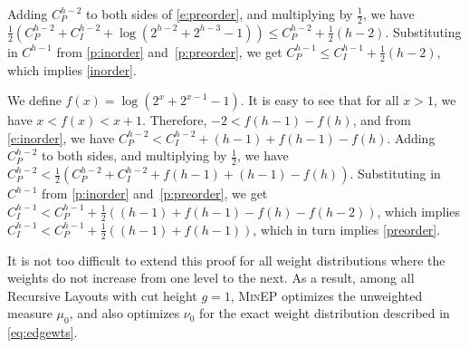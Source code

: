 \documentclass[10pt,conference,letterpaper]{IEEEtran}
\newcommand{\todo}[1]{}
\newcommand{\RLs}{Recursive Layouts\xspace}
\newcommand{\pmean}[1][p]{\ensuremath{\mu_{#1}}\xspace}
\newcommand{\pwmean}[1][p]{\ensuremath{\nu_{#1}}\xspace}
\newcommand{\minep}{\textsc{MinEP}\xspace}
\begin{document}
\begin{IEEEproof}
Adding $C_P^{h-2}$ to both sides of \eqref{e:preorder}, and multiplying by $\frac{1}{2}$, we have
$\frac{1}{2} (C_P^{h-2} + C_I^{h-2} + \log(2^{h-2}+2^{h-3}-1)) \leq C_P^{h-2} + \frac{1}{2} (h-2)$. 
Substituting in $C^{h-1}$ from \eqref{p:inorder} and~\eqref{p:preorder}, we get
$C_P^{h-1} \leq C_I^{h-1} + \frac{1}{2} (h-2)$, which implies \eqref{inorder}.

We define $f(x) = \log (2^x + 2^{x-1} - 1)$. It is easy to see that for all $x>1$, we have $x < f(x) < x+1$. Therefore, $-2 < f(h-1) - f(h)$, and from \eqref{e:inorder}, we have $C_P^{h-2} < C_I^{h-2} + (h-1) + f(h-1) - f(h)$.
Adding $C_P^{h-2}$ to both sides, and multiplying by $\frac{1}{2}$, we have 
$C_P^{h-2} < \frac{1}{2} (C_P^{h-2} + C_I^{h-2} + f(h-1) + (h-1) - f(h))$. 
Substituting in $C^{h-1}$ from \eqref{p:inorder} and~\eqref{p:preorder}, we get 
$C_I^{h-1} < C_P^{h-1} + \frac{1}{2} ((h-1) + f(h-1) - f(h) - f(h-2))$, which implies 
$C_I^{h-1} < C_P^{h-1} + \frac{1}{2} ((h-1) + f(h-1))$, which in turn implies 
\eqref{preorder}.

It is not too difficult to extend this proof for all weight distributions where the weights do not increase from one level to the next. As a result, 
among all \RLs with cut height $g=1$, \minep optimizes the unweighted measure \pmean[0], and also optimizes \pwmean[0] for the exact weight distribution described in \autoref{eq:edgewts}.
\todo{Finish proof to fix Case 3. Done.}
\end{IEEEproof}
 
\end{document}
